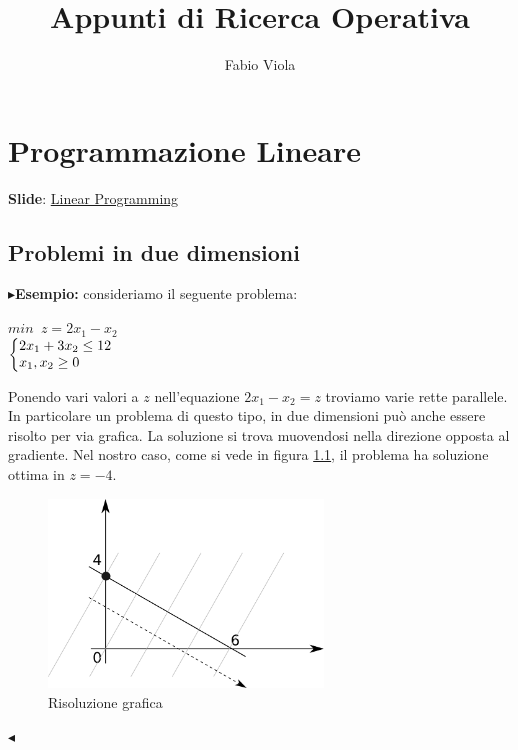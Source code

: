 \documentclass[11pt]{book}
\title{Appunti di Ricerca Operativa}
\author{Fabio Viola}
\date{}
\makeatletter
\newenvironment{sistema}%
{\left\lbrace\begin{array}{@{}l@{}}}%
{\end{array}\right.}
\makeatother
\begin{document}
\chapter{Programmazione Lineare}

\scriptsize
{\bf Slide}:
\href{http://www.or.deis.unibo.it/staff_pages/martello/Chapter3.zip}{Linear
Programming}
\normalsize
\vspace{20pt}


\section{Problemi in due dimensioni}

$\blacktriangleright${\bf Esempio:} consideriamo il seguente problema:

\begin{center}
$min\phantom{a}z = 2x_1 - x_2 $ \\
$
  \begin{sistema}
    2x_1 + 3x_2 \leq 12 \\
    x_1, x_2 \geq 0
  \end{sistema}
$
\end{center}

Ponendo vari valori a $z$ nell'equazione $2x_1 - x_2 = z$ troviamo
varie rette parallele. In particolare un problema di questo tipo, in
due dimensioni pu\`o anche essere risolto per via grafica. La
soluzione si trova muovendosi nella direzione opposta al
gradiente. Nel nostro caso, come si vede in figura \ref{gradiente}, il
problema ha soluzione ottima in $z = -4$.

\begin{figure}
  \centering
  \includegraphics[width=0.65\textwidth]{images/gradiente.png}
  \caption{Risoluzione grafica}
  \label{gradiente}
\end{figure}

$\blacktriangleleft$
\newline\vspace{11pt}
\end{document}
